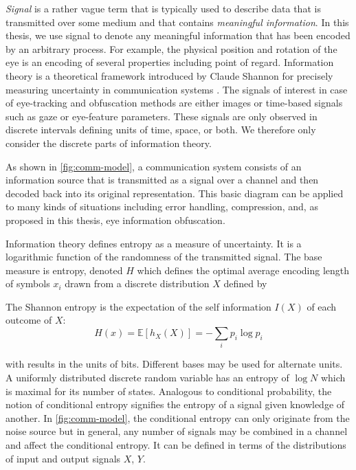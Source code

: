 \textit{Signal} is a rather vague term that is typically used to describe data that is transmitted over some medium and that contains \textit{meaningful information}. In this thesis, we use signal to denote any meaningful information that has been encoded by an arbitrary process. For example, the physical position and rotation of the eye is an encoding of several properties including point of regard. Information theory is a theoretical framework introduced by Claude Shannon for precisely measuring uncertainty in communication systems \parencite{shannon1948mathematical}. The signals of interest in case of eye-tracking and obfuscation methods are either images or time-based signals such as gaze or eye-feature parameters. These signals are only observed in discrete intervals defining units of time, space, or both. We therefore only consider the discrete parts of information theory. 

As shown in \cref{fig:comm-model}, a communication system consists of an information source that is transmitted as a signal over a channel and then decoded back into its original representation. This basic diagram can be applied to many kinds of situations including error handling, compression, and, as proposed in this thesis, eye information obfuscation.


Information theory defines entropy as a measure of uncertainty. It is a logarithmic function of the randomness of the transmitted signal. 
The base measure is entropy, denoted $H$ which defines the optimal average encoding length of symbols $x_i$ drawn from a discrete distribution $X$ defined by
\begin{definition}
The Shannon entropy is the expectation of the self information $I(X)$ of each outcome of $X$:
\begin{equation}
    H(x) = \mathbb{E}[h_X(X)] = - \sum_i p_i\log p_i
\end{equation}
\end{definition}

with results in the units of bits. Different bases may be used for alternate units. A uniformly distributed discrete random variable has an entropy of $\log{N}$ which is maximal for its number of states. Analogous to conditional probability, the notion of conditional entropy signifies the entropy of a signal given knowledge of another. In \cref{fig:comm-model}, the conditional entropy can only originate from the noise source but in general, any number of signals may be combined in a channel and affect the conditional entropy. It can be defined in terms of the distributions of input and output signals $X$, $Y$.


